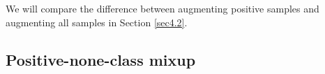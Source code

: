 \documentclass[11pt]{article}
\begin{document}

We will compare the difference between augmenting positive samples and augmenting all samples in Section \ref{sec4.2}.

\subsection{Positive-none-class mixup}
\end{document}

